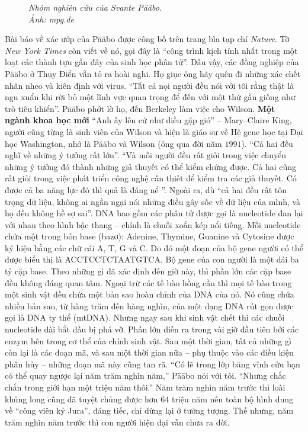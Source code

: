 \begin{multicols}{2}
\begin{figure}[H]
		\caption{\small\textit{\color{timhieukhoahoc}Nhóm nghiên cứu của Svante Pääbo. \\Ảnh: mpg.de}}
		\vspace*{-10pt}
	\end{figure}
	Bài báo về xác ướp của Pääbo được công bố trên trang bìa tạp chí \textit{Nature}. Tờ \textit{New York Times} còn viết về nó, gọi đây là “công trình kịch tính nhất trong một loạt các thành tựu gần đây của sinh học phân tử”. Dẫu vậy, các đồng nghiệp của Pääbo ở Thụy Điển vẫn tỏ ra hoài nghi. Họ giục ông hãy quên đi những xác chết nhăn nheo và kiên định với virus. “Tất cả nọi người đều nói với tôi rằng thật là ngu xuẩn khi rời bỏ một lĩnh vực quan trọng để đến với một thứ gần giống như trò tiêu khiển”. Pääbo phớt lờ họ, đến Berkeley làm việc cho Wilson.
	\vskip 0.1cm
	\textbf{\color{timhieukhoahoc}Một ngành khoa học mới}
	\vskip 0.1cm
	“Anh ấy lên cứ như diều gặp gió” -- Mary--Claire King, người cũng từng là sinh viên của Wilson và hiện là giáo sư về Hệ gene học tại Đại học Washington, nhớ là Pääbo và Wilson (ông qua đời năm $1991$). “Cả hai đều nghĩ về những ý tưởng rất lớn”. “Và mỗi người đều rất giỏi trong việc chuyển những ý tưởng đó thành những giả thuyết có thể kiểm chứng được. Cả hai cũng rất giỏi trong việc phát triển công nghệ cần thiết để kiểm tra các giả thuyết. Có được cả ba năng lực đó thì quả là đáng nể ”. Ngoài ra,  dù ``cả hai đều rất tôn trọng dữ liệu, không ai ngần ngại nói những điều gây sốc về dữ liệu của mình, và họ đều không hề sợ sai”.
	\vskip 0.1cm
	DNA bao gồm các phân tử được gọi là nucleotide đan lại với nhau theo hình bậc thang -- chính là chuỗi xoắn kép nổi tiếng. Mỗi nucleotide chứa một trong bốn base (bazơ): Adenine, Thymine, Guanine và Cytosine được ký hiệu bằng các chữ cái A, T, G và C. Do đó một đoạn của bộ gene người có thể được biểu thị là ACCTCCTCTAATGTCA. Bộ gene của con người là một dải ba tỷ cặp base. Theo những gì đã xác định đến giờ này, thì phần lớn các cặp base đều không đáng quan tâm.
	\vskip 0.1cm
	Ngoại trừ các tế bào hồng cầu thì mọi tế bào trong một sinh vật đều chứa một bản sao hoàn chỉnh của DNA của nó. Nó cũng chứa nhiều bản sao, từ hàng trăm đến hàng nghìn, của một dạng DNA rút gọn được gọi là DNA ty thể (mtDNA). Nhưng ngay sau khi sinh vật chết thì các chuỗi nucleotide dài bắt đầu bị phá vỡ. Phần lớn diễn ra trong vài giờ đầu tiên bởi các enzym bên trong cơ thể của chính sinh vật. Sau một thời gian, tất cả những gì còn lại là các đoạn mã, và sau một thời gian nữa -- phụ thuộc vào các điều kiện phân hủy -- những đoạn mã này cũng tan rã. “Có lẽ trong lớp băng vĩnh cửu bạn có thể quay ngược lại năm trăm nghìn năm,” Pääbo nói với tôi. “Nhưng chắc chắn trong giới hạn một triệu năm thôi.” Năm trăm nghìn năm trước thì loài khủng long cũng đã tuyệt chủng được hơn $64$ triệu năm nên toàn bộ hình dung về “công viên kỷ Jura”, đáng tiếc, chỉ dừng lại ở tưởng tượng. Thế nhưng, năm trăm nghìn năm trước thì con người hiện đại vẫn chưa ra đời.

\end{multicols}
